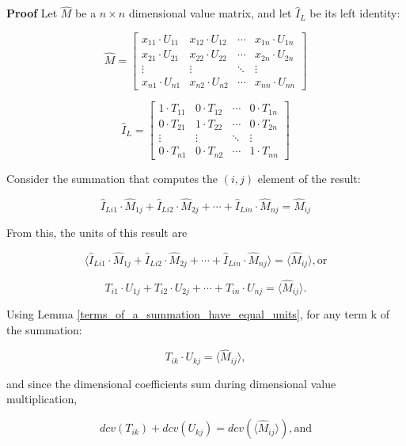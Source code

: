 \documentclass[10pt,letterpaper]{article}
\newenvironment{proof}{\noindent\textbf{Proof} }{\qed \newline}
\newcommand{\qed}{\nobreak \ifvmode \relax \else
      \ifdim\lastskip<1.5em \hskip-\lastskip
      \hskip1.5em plus0em minus0.5em \fi \nobreak
      \vrule height0.75em width0.5em depth0.25em\fi}
\numberwithin{equation}{section}
\begin{document}
\begin{proof}
Let $\hat M$ be a $n \times n$ dimensional value matrix, and let $\hat I_L$ be its left identity:

\[ \hat M = \left[ \begin{matrix} 
  x_{11} \cdot U_{11} & x_{12} \cdot U_{12} & \cdots & x_{1n} \cdot U_{1n} \\
  x_{21} \cdot U_{21} & x_{22} \cdot U_{22} & \cdots & x_{2n} \cdot U_{2n} \\
  \vdots & \vdots & \ddots & \vdots \\
  x_{n1} \cdot U_{n1} & x_{n2} \cdot U_{n2} & \cdots & x_{nn} \cdot U_{nn}
 \end{matrix} \right] \]

\[ \hat I_L = \left[ \begin{matrix} 
  1 \cdot T_{11} & 0 \cdot T_{12} & \cdots & 0 \cdot T_{1n} \\
  0 \cdot T_{21} & 1 \cdot T_{22} & \cdots & 0 \cdot T_{2n} \\
  \vdots & \vdots & \ddots & \vdots \\
  0 \cdot T_{n1} & 0 \cdot T_{n2} & \cdots & 1 \cdot T_{nn}
 \end{matrix} \right] \]

Consider the summation that computes the $(i, j)$ element of the result:

\[ \hat I_{Li1} \cdot \hat M_{1j} + \hat I_{Li2} \cdot \hat M_{2j} + \cdots + \hat I_{Lin} \cdot \hat M_{nj} = \hat M_{ij} \]

From this, the units of this result are

\[ \langle \hat I_{Li1} \cdot \hat M_{1j} + \hat I_{Li2} \cdot \hat M_{2j} + \cdots + \hat I_{Lin} \cdot \hat M_{nj} \rangle = \langle \hat M_{ij} \rangle , \mbox{or} \]

\[ T_{i1} \cdot U_{1j} + T_{i2} \cdot U_{2j} + \cdots + T_{in} \cdot U_{nj} = \langle \hat M_{ij} \rangle . \]

Using Lemma \ref{terms_of_a_summation_have_equal_units}, for any term k of the summation:

\[ T_{ik} \cdot U_{kj} = \langle \hat M_{ij} \rangle , \]

and since the dimensional coefficients sum during dimensional value multiplication,

\begin{equation} \label{basic_equation_1_for_left_identity_ddv_proof} dcv(T_{ik}) + dcv(U_{kj}) = dcv( \langle \hat M_{ij} \rangle ) , \mbox{and} \end{equation}


\end{proof}
\end{document}
